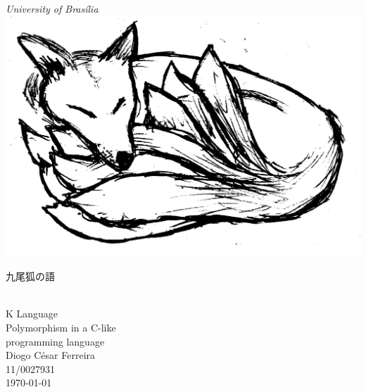 \documentclass[12pt]{article}
\begin{document}
\begin{titlepage}
   \begin{center}

	\large
	\textit{University of Brasília} \\
	
    \vfill
	\includegraphics[width=0.27\linewidth]{../slides/kyu.png} \\
	
	\vspace*{0.3cm}
	\small
	\begin{CJK}{UTF8}{min}
		九\hspace{0.57cm}尾\hspace{0.57cm}狐\hspace{0.57cm}の\hspace{0.57cm}語
	\end{CJK} \\
	
	\huge K Language \vspace*{0.3cm} \\
	\normalsize
	Polymorphism in a C-like \\
	programming language \\

	\vspace*{3cm}
	\large
	Diogo César Ferreira\\
	\vspace*{0.3cm}
	11/0027931 \\
	
	\vfill
	\normalsize
	\today
   \end{center}
\end{titlepage}


\end{document}
